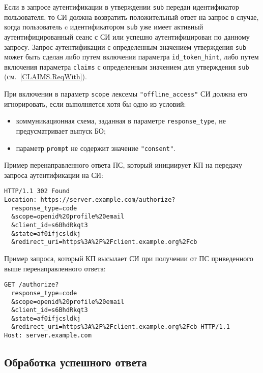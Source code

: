 Если в запросе аутентификации в утверждении \lstinline{sub} передан 
идентификатор пользователя, то СИ должна возвратить положительный ответ на 
запрос в случае, когда пользователь c идентификатором \lstinline{sub} 
уже имеет активный аутентифицированный сеанс с СИ или успешно аутентифицирован 
по данному запросу.
%
Запрос аутентификации с определенным значением утверждения \lstinline{sub} может
быть сделан либо путем включения параметра \lstinline{id_token_hint}, либо путем
включения параметра \lstinline{claims} с определенным значением для утверждения
\lstinline{sub} (см.~\ref{CLAIMS.ReqWith}).


При включении в параметр \lstinline{scope} лексемы \lstinline{"offline_access"}
СИ должна его игнорировать, если выполняется хотя бы одно из условий:
\begin{itemize}
\item
коммуникационная схема, заданная в параметре \lstinline{response_type}, 
не предусматривает выпуск БО;
\item
параметр \lstinline{prompt} не содержит значение \lstinline{"consent"}.
\end{itemize}

Пример перенаправленного ответа ПС, который инициирует КП на передачу запроса 
аутентификации на СИ: 
%
\begin{lstlisting}
HTTP/1.1 302 Found
Location: https://server.example.com/authorize?
  response_type=code
  &scope=openid%20profile%20email
  &client_id=s6BhdRkqt3
  &state=af0ifjcsldkj
  &redirect_uri=https%3A%2F%2Fclient.example.org%2Fcb
\end{lstlisting}

Пример запроса, который КП высылает СИ при получении от ПС приведенного 
выше перенаправленного ответа:
%
\begin{lstlisting}
GET /authorize?
  response_type=code
  &scope=openid%20profile%20email
  &client_id=s6BhdRkqt3
  &state=af0ifjcsldkj
  &redirect_uri=https%3A%2F%2Fclient.example.org%2Fcb HTTP/1.1
Host: server.example.com
\end{lstlisting}

\subsection{Обработка успешного ответа}\label{REQRESP.Auth.Resp}

